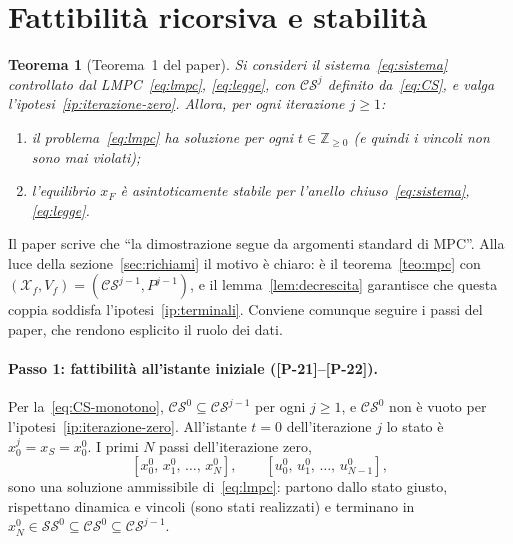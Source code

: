 \documentclass[11pt,a4paper]{article}
\theoremstyle{definition}
\theoremstyle{plain}
\newtheorem{teorema}[definizione]{Teorema}
\theoremstyle{remark}
\newcommand{\Zn}{\mathbb{Z}_{\ge 0}}
\newcommand{\Xf}{\mathcal{X}_f}
\newcommand{\SSet}{\mathcal{SS}}
\newcommand{\CS}{\mathcal{CS}}
\newcommand{\eqp}[1]{\textup{[P-#1]}}   %
\begin{document}
\section{Fattibilità ricorsiva e stabilità}\label{sec:stabilita}

\begin{teorema}[Teorema~1 del paper]\label{teo:1}
Si consideri il sistema~\eqref{eq:sistema} controllato dal LMPC~\eqref{eq:lmpc},
\eqref{eq:legge}, con $\CS^j$ definito da~\eqref{eq:CS}, e valga
l'ipotesi~\ref{ip:iterazione-zero}. Allora, per ogni iterazione $j\ge 1$:
\begin{enumerate}
  \item il problema~\eqref{eq:lmpc} ha soluzione per ogni $t\in\Zn$
        (e quindi i vincoli non sono mai violati);
  \item l'equilibrio $x_F$ è asintoticamente stabile per l'anello
        chiuso~\eqref{eq:sistema}, \eqref{eq:legge}.
\end{enumerate}
\end{teorema}

Il paper scrive che ``la dimostrazione segue da argomenti standard di MPC''.
Alla luce della sezione~\ref{sec:richiami} il motivo è chiaro: è il
teorema~\ref{teo:mpc} con $(\Xf,V_f)=(\CS^{j-1},P^{j-1})$, e il
lemma~\ref{lem:decrescita} garantisce che questa coppia soddisfa
l'ipotesi~\ref{ip:terminali}. Conviene comunque seguire i passi del paper, che
rendono esplicito il ruolo dei dati.

\paragraph{Passo 1: fattibilità all'istante iniziale (\eqp{21}--\eqp{22}).}
Per la~\eqref{eq:CS-monotono}, $\CS^0\subseteq\CS^{j-1}$ per ogni $j\ge 1$, e
$\CS^0$ non è vuoto per l'ipotesi~\ref{ip:iterazione-zero}. All'istante $t=0$
dell'iterazione $j$ lo stato è $x^j_0=x_S=x^0_0$. I primi $N$ passi
dell'iterazione zero,
\[
  [x^0_0,\,x^0_1,\,\dots,\,x^0_N],\qquad [u^0_0,\,u^0_1,\,\dots,\,u^0_{N-1}],
\]
sono una soluzione ammissibile di~\eqref{eq:lmpc}: partono dallo stato giusto,
rispettano dinamica e vincoli (sono stati realizzati) e terminano in
$x^0_N\in\SSet^0\subseteq\CS^0\subseteq\CS^{j-1}$.
\end{document}
